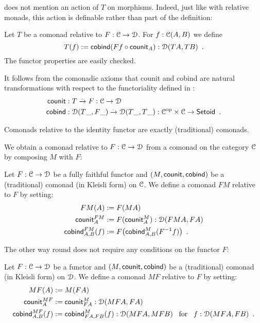 \documentclass[a4paper,USenglish]{lipics}
\begin{document}
  does not mention an action of $T$ on morphisms. Indeed, just like with relative monads, this action is definable rather than part of the definition:
\begin{defn}%
\label{def:lift}
 Let $T$ be a  comonad relative to $F:\C\to\D$.
 For $f : \C(A,B)$ we define
  \[ T(f) := \cobind(\comp{\counit_A}{Ff}) : \D(TA,TB) \enspace .\] 
 The functor properties are easily checked.
\end{defn}

\begin{rem}
 It follows from the comonadic axioms that
 counit and cobind are natural transformations with respect to the functoriality defined in :
 \begin{align*}
     \counit &: T \xrightarrow{.} F : \C\to \D \\
     \cobind &: \D(T\_, F\_) \xrightarrow{.} \D(T\_, T\_) : \C^{\text{op}} \times \C \to \Setoid \enspace .
 \end{align*}

\end{rem}





Comonads relative to the identity functor are exactly (traditional) comonads.




We obtain a comonad relative to $F:\C\to\D$ from a comonad on the category $\C$ by composing $M$ with $F$:
\begin{ex}\label{ex_relcom_from_com}
  Let $F : \C \to \D$ be a fully faithful functor and $(M,\counit,\cobind)$ be a (traditional) comonad (in Kleisli form) on $\C$.
  We define a comonad $FM$ relative to $F$ by setting:
   \begin{align*}
        FM(A) &:= F(MA) \\
        \counit^{FM}_A &:= F(\counit^M_A) : \D(FMA,FA) \\
        \cobind^{FM}_{A,B} (f) &:= F\bigl(\cobind^M_{A,B}(F^{-1}f)\bigr) \enspace .
    \end{align*}

\end{ex}

\noindent
The other way round does not require any conditions on the functor $F$:
\begin{ex}\label{ex_relcom_from_com_on_target}
    Let $F : \C \to \D$ be a functor and $(M,\counit,\cobind)$ be a (traditional) comonad (in Kleisli form) on $\D$.
  We define a comonad $MF$ relative to $F$ by setting:
  \begin{align*}
      MF(A) &:= M(FA)\\
      \counit^{MF}_A &:= \counit^M_{FA} : \D(MFA,FA) \\
      \cobind^{MF}_{A,B} (f) &:= \cobind^M_{FA,FB}(f) : \D(MFA,MFB) \enspace \text{ for } \enspace f : \D(MFA,FB) \enspace .
  \end{align*}
\end{ex}
\end{document}
